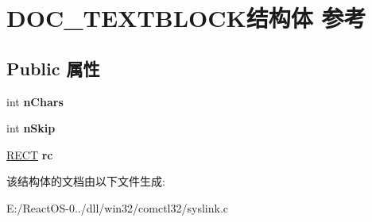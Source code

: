 \hypertarget{struct_d_o_c___t_e_x_t_b_l_o_c_k}{}\section{D\+O\+C\+\_\+\+T\+E\+X\+T\+B\+L\+O\+C\+K结构体 参考}
\label{struct_d_o_c___t_e_x_t_b_l_o_c_k}
\subsection*{Public 属性}
\begin{DoxyCompactItemize}
\item 
\mbox{\label{struct_d_o_c___t_e_x_t_b_l_o_c_k_ae074ef8e3834008103febfef20028d37}} 
int {\bfseries n\+Chars}
\item 
\mbox{\label{struct_d_o_c___t_e_x_t_b_l_o_c_k_ace06b06227a56d70e74e8b85d6c41a51}} 
int {\bfseries n\+Skip}
\item 
\mbox{\label{struct_d_o_c___t_e_x_t_b_l_o_c_k_a19c48d31a6ebd1bcfd053f9bdc151666}} 
\hyperlink{structtag_r_e_c_t}{R\+E\+CT} {\bfseries rc}
\end{DoxyCompactItemize}


该结构体的文档由以下文件生成\+:\begin{DoxyCompactItemize}
\item 
E\+:/\+React\+O\+S-\/0../dll/win32/comctl32/syslink.\+c\end{DoxyCompactItemize}
